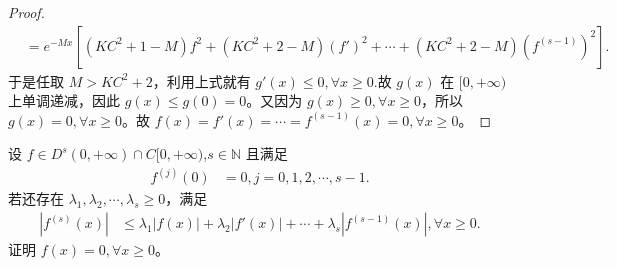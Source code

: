 \documentclass[../../main.tex]{subfiles}
\begin{document}
\begin{proof}
\begin{align*}
&=e^{-Mx}\left[ \left( KC^2+1-M \right) f^2+\left( KC^2+2-M \right) \left( f' \right) ^2+\cdots +\left( KC^2+2-M \right) \left( f^{\left( s-1 \right)} \right) ^2 \right] .
\end{align*}
于是任取 $M>KC^2+2$，利用上式就有 $g'\left( x \right) \leqslant 0,\forall x\geqslant  0$.故 $g\left( x \right)$ 在 $[0,+\infty )$ 上单调递减，因此 $g\left( x \right) \leqslant g\left( 0 \right) =0$。又因为 $g\left( x \right) \geqslant 0,\forall x\geqslant 0$，所以 $g\left( x \right) =0,\forall x\geqslant 0$。故
$f\left( x \right) =f'\left( x \right) =\cdots =f^{\left( s-1 \right)}\left( x \right) =0,\forall x\geqslant 0$。

\end{proof}

\begin{proposition}\label{proposition:关于导数求和不等式问题}
设 $f \in D^s(0,+\infty) \cap C[0,+\infty)$,$s \in \mathbb{N}$ 且满足
\begin{align*}
f^{(j)}(0) &= 0, j = 0, 1, 2, \cdots, s - 1.
\end{align*}
若还存在 $\lambda_1, \lambda_2, \cdots, \lambda_s \geqslant  0$，满足
\begin{align}\label{aaaaproposition7.19-0.1}
\left| f^{(s)}(x) \right| &\leqslant  \lambda_1 \left| f(x) \right| + \lambda_2 \left| f'(x) \right| + \cdots + \lambda_s \left| f^{(s-1)}(x) \right|, \forall x \geqslant  0.
\end{align}
证明 $f(x) = 0, \forall x \geqslant  0$。
\end{proposition}
\end{document}
